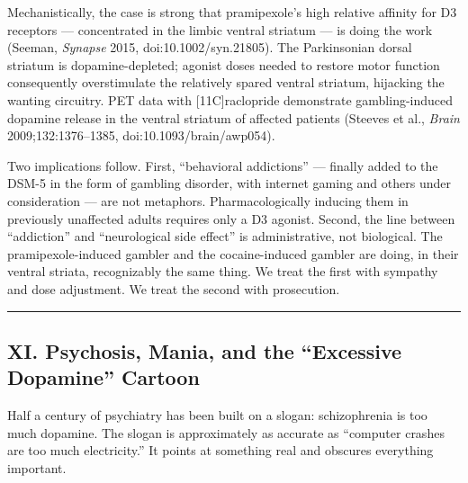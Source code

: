 Mechanistically, the case is strong that pramipexole's high relative affinity for D3 receptors --- concentrated in the limbic ventral striatum --- is doing the work (Seeman, \emph{Synapse} 2015, doi:10.1002/syn.21805). The Parkinsonian dorsal striatum is dopamine-depleted; agonist doses needed to restore motor function consequently overstimulate the relatively spared ventral striatum, hijacking the wanting circuitry. PET data with {[}11C{]}raclopride demonstrate gambling-induced dopamine release in the ventral striatum of affected patients (Steeves et al., \emph{Brain} 2009;132:1376--1385, doi:10.1093/brain/awp054).

Two implications follow. First, ``behavioral addictions'' --- finally added to the DSM-5 in the form of gambling disorder, with internet gaming and others under consideration --- are not metaphors. Pharmacologically inducing them in previously unaffected adults requires only a D3 agonist. Second, the line between ``addiction'' and ``neurological side effect'' is administrative, not biological. The pramipexole-induced gambler and the cocaine-induced gambler are doing, in their ventral striata, recognizably the same thing. We treat the first with sympathy and dose adjustment. We treat the second with prosecution.

\begin{center}\rule{0.5\linewidth}{0.5pt}\end{center}

\subsection{XI. Psychosis, Mania, and the ``Excessive Dopamine'' Cartoon}\label{09_dopamine_spectrum-xi.-psychosis-mania-and-the-excessive-dopamine-cartoon}

Half a century of psychiatry has been built on a slogan: schizophrenia is too much dopamine. The slogan is approximately as accurate as ``computer crashes are too much electricity.'' It points at something real and obscures everything important.

